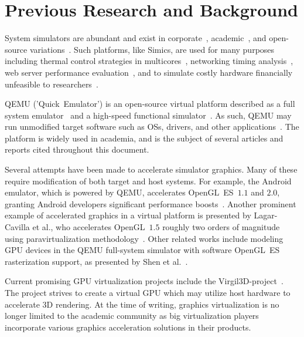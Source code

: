 
\section{Previous Research and Background}
\label{sec:previousresearch}
System simulators are abundant and exist in corporate~, academic~, and open-source variations~.
Such platforms, like Simics, are used for many purposes including thermal control strategies in multicores~, networking timing analysis~, web server performance evaluation~, and to simulate costly hardware financially unfeasible to researchers~.

QEMU ('Quick~Emulator') is an open-source virtual platform described as a full system emulator~ and a high-speed functional simulator~.
As such, QEMU may run unmodified target software such as OSs, drivers, and other applications~.
The platform is widely used in academia, and is the subject of several articles and reports cited throughout this document.

Several attempts have been made to accelerate simulator graphics.
Many of these require modification of both target and host systems.
For example, the Android emulator, which is powered by QEMU, accelerates OpenGL~ES~$1.1$ and $2.0$, granting Android developers significant performance boosts~.
Another prominent example of accelerated graphics in a virtual platform is presented by Lagar-Cavilla et al., who accelerates OpenGL~$1.5$ roughly two orders of magnitude using paravirtualization methodology~.
Other related works include modeling GPU devices in the QEMU full-system simulator with software OpenGL~ES rasterization support, as presented by Shen et al.~.

Current promising GPU virtualization projects include the Virgil3D-project~.
The project strives to create a virtual GPU which may utilize host hardware to accelerate 3D rendering.
At the time of writing, graphics virtualization is no longer limited to the academic community as big virtualization players incorporate various graphics acceleration solutions in their products.


